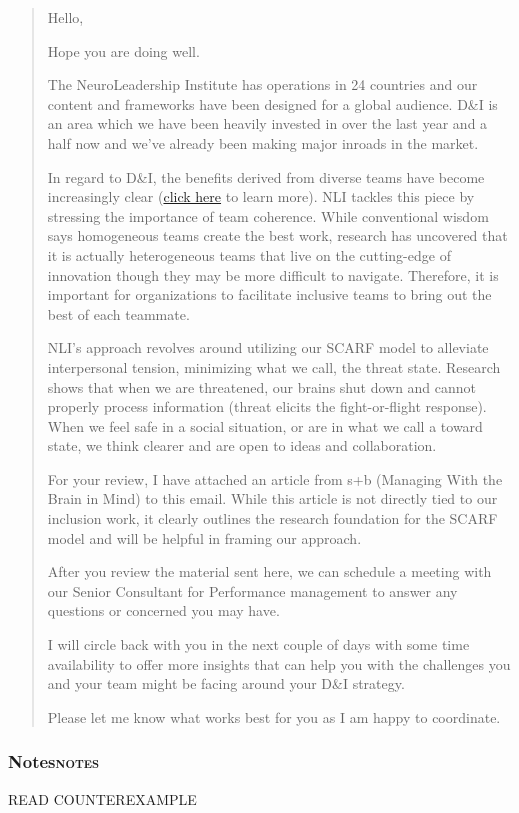 \documentclass[12pt]{article}
\begin{document}
\begin{quote}
Hello,

Hope you are doing well.

The NeuroLeadership Institute has operations in 24 countries and our content and frameworks have been designed for a global audience. D\&I is an area which we have been heavily invested in over the last year and a half now and we've already been making major inroads in the market.

In regard to D\&I, the benefits derived from diverse teams have become
increasingly clear (\href{https://hbr.org/2016/11/why-diverse-teams-are-smarter}{click here} to learn more). NLI tackles this piece by stressing the importance of team coherence. While conventional wisdom says homogeneous teams create the best work, research has uncovered that it is actually heterogeneous teams that live on the cutting-edge of innovation though they may be more difficult to navigate. Therefore, it is important for organizations to facilitate inclusive teams to bring out the best of each teammate.

NLI's approach revolves around utilizing our SCARF model to alleviate interpersonal tension, minimizing what we call, the threat state. Research shows that when we are threatened, our brains shut down and cannot properly process information (threat elicits the fight-or-flight response). When we feel safe in a social situation, or are in what we call a toward state, we think clearer and are open to ideas and collaboration.

For your review, I have attached an article from s+b (Managing With the Brain in Mind) to this email. While this article is not directly tied to our inclusion work, it clearly outlines the research foundation for the SCARF model and will be helpful in framing our approach.

After you review the material sent here, we can schedule a meeting with our Senior Consultant for Performance management to answer any questions or concerned you may have.

I will circle back with you in the next couple of days with some time availability to offer more insights that can help you with the challenges you and your team might be facing around your D\&I strategy.

Please let me know what works best for you as I am happy to coordinate.
\end{quote}

\subsubsection[Notes]{Notes\hfill{}\textsc{notes}}
\label{sec:orge934131}
READ COUNTEREXAMPLE
\end{document}
